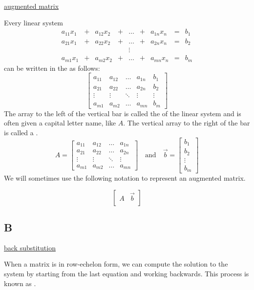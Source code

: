 \documentclass{ximera}
\begin{document}
\href{https://ximera.osu.edu/linearalgebradzv3/LinearAlgebraInteractiveIntro/SYS-0020/main}{augmented matrix}
\begin{expandable}{}{}
    Every linear system 
$$\begin{array}{ccccccccc}
      a_{11}x_1 &+ &a_{12}x_2&+&\ldots&+&a_{1n}x_n&= &b_1 \\
	 a_{21}x_1 &+ &a_{22}x_2&+&\ldots&+&a_{2n}x_n&= &b_2 \\
     &&&&\vdots&&&& \\
     a_{m1}x_1 &+ &a_{m2}x_2&+&\ldots&+&a_{mn}x_n&= &b_m
    \end{array}$$
    can be written in the  as follows:
    $$\left[\begin{array}{cccc|c}  
 a_{11}&a_{12}&\ldots&a_{1n}&b_1\\a_{21}&a_{22}&\ldots&a_{2n}&b_2\\\vdots&\vdots&\ddots&\vdots&\vdots\\a_{m1}&a_{m2}&\ldots&a_{mn}&b_m
 \end{array}\right]$$
 The array to the left of the vertical bar is called the  of the linear system and is often given a capital letter name, like $A$.  The vertical array to the right of the bar is called a .
 $$A=\begin{bmatrix}a_{11}&a_{12}&\ldots&a_{1n}\\a_{21}&a_{22}&\ldots&a_{2n}\\\vdots&\vdots&\ddots&\vdots\\a_{m1}&a_{m2}&\ldots&a_{mn}\end{bmatrix}\quad\text{and}\quad\vec{b}=\begin{bmatrix}b_1\\b_2\\\vdots\\b_m\end{bmatrix}$$
We will sometimes use the following notation to represent an augmented matrix.

$$\left[\begin{array}{c|c}  
 A & \vec{b}\\
 \end{array}\right]$$
\end{expandable}

\subsection*{B}

\href{https://ximera.osu.edu/linearalgebradzv3/LinearAlgebraInteractiveIntro/SYS-0020/main}{back substitution}
\begin{expandable}{}{}
When a matrix is in row-echelon form, we can compute the solution to the system by starting from the last equation and working backwards.  This process is known as .
\end{expandable}
\end{document}
